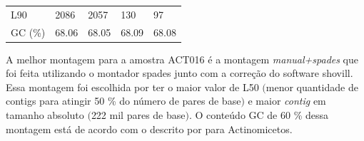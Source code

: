 \begin{table}[htb]
{\begin{tabular}{lllll}
		L90                                          & 2086                                   & 2057                                    & 130                               & 97                                                                 \\
		GC (\%)                                      & 68.06                                  & 68.05                                   & 68.09                             & 68.08                                                        \\
	\bottomrule
    \end{tabular}
	}{%
	\centering
	  }
\end{table}


A melhor montagem para a amostra ACT016 é a montagem \textit{manual+spades} que foi feita utilizando
o montador spades junto com a correção do software shovill. Essa montagem foi escolhida por ter o maior
valor de L50 $($menor quantidade de contigs para atingir 50 \% do número de pares de base$)$ e maior 
\textit{contig} em tamanho absoluto $($222 mil pares de base$)$. O conteúdo GC de 60 \% dessa montagem está de acordo
com o descrito por  para Actinomicetos.

